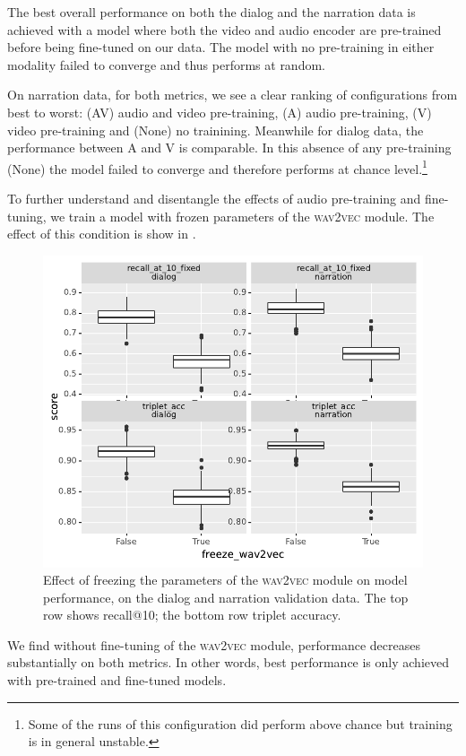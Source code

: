 The best overall performance on both the dialog and the narration data is 
achieved with a model where both the video and audio encoder are pre-trained 
before being fine-tuned on our data. The model with no pre-training in
either modality failed to converge and thus performs at random.


On narration data, for both metrics, we see a clear ranking of
configurations from best to worst: (AV) audio and video pre-training,
(A) audio pre-training, (V) video pre-training and (None) no
trainining. Meanwhile for dialog data, the performance between A and V
is comparable. In this absence of any pre-training (None) the model failed
to converge and therefore performs at chance level.\footnote{Some of
  the runs of this configuration did perform above chance but
  training is in general unstable.}

To further understand and disentangle the effects of audio pre-training and 
fine-tuning, we train a model with frozen parameters of the 
\textsc{wav2vec} module. The effect of this condition is show in .
\begin{figure}[htb]
  \centering
  \includegraphics[width=\columnwidth]{results/ablations/freeze_wav2vec.pdf}
  \caption{Effect of freezing the parameters of the \textsc{wav2vec}
    module on model performance, on the dialog and narration
    validation data. The top row shows recall@10; the bottom row
    triplet accuracy.}
  \label{fig:freeze_wav2vec}
\end{figure}
We find without fine-tuning of the \textsc{wav2vec} module, performance decreases substantially 
on both metrics. In other words, best performance is only achieved with pre-trained and 
fine-tuned models.


